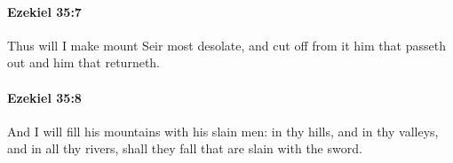 		\paragraph{Ezekiel 35:7} %
			\label{EZEKIEL-35-7}

			Thus will I make mount Seir most desolate, and cut off from it him that passeth out and him that returneth.


		\paragraph{Ezekiel 35:8} %
			\label{EZEKIEL-35-8}

			And I will fill his mountains with his slain men: in thy hills, and in thy valleys, and in all thy rivers, shall they fall that are slain with the sword.



